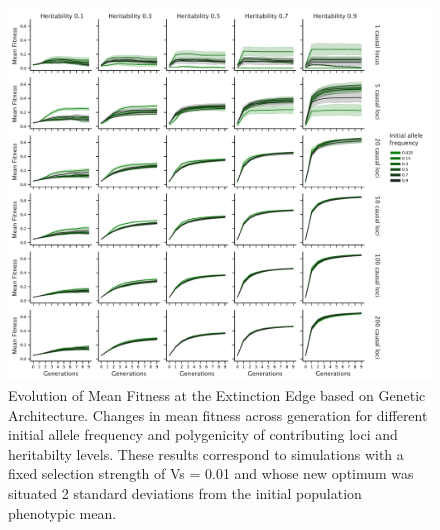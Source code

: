 \documentclass{article}
\begin{document}
\begin{figure}[b]
    \centering
    \includegraphics[width=1\textwidth]{figures/mean_fitness_acrossgen.pdf}
    \caption{Evolution of Mean Fitness at the Extinction Edge based on Genetic Architecture. Changes in mean fitness across generation for different initial allele frequency and polygenicity of contributing loci and heritabilty levels. These results correspond to simulations with a fixed selection strength of Vs = 0.01 and whose new optimum was situated 2 standard deviations from the initial population phenotypic mean.}
    \label{fig:mean_fitness_acrossgen}
\end{figure}
\end{document}
